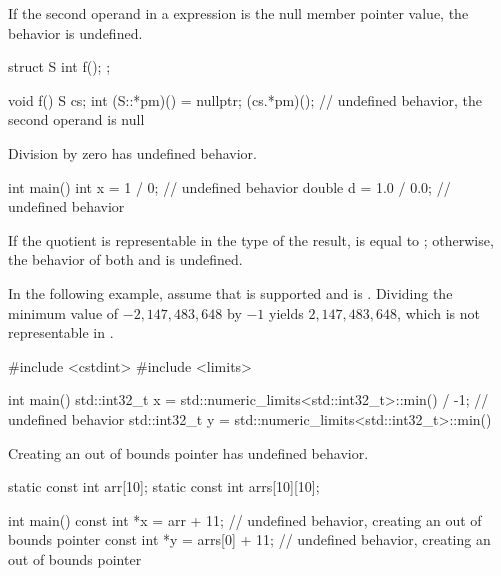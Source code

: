 \pnum
If the second operand in a  expression is the null
member pointer value, the behavior is undefined.

\pnum
\begin{example}
\begin{codeblock}
struct S {
  int f();
};

void f() {
  S cs;
  int (S::*pm)() = nullptr;
  (cs.*pm)();           // undefined behavior, the second operand is null
}
\end{codeblock}
\end{example}


\pnum
Division by zero has undefined behavior.

\pnum
\begin{example}
\begin{codeblock}
int main() {
  int x = 1 / 0;        // undefined behavior
  double d = 1.0 / 0.0; // undefined behavior
}
\end{codeblock}
\end{example}


\pnum
If the
quotient 
is representable in the type of the result,
is equal to ;
otherwise, the behavior of both  and  is undefined.

\pnum
\begin{example}
In the following example, assume that
 is supported
and is .
Dividing the minimum  value
of $-2{,}147{,}483{,}648$
by $-1$ yields
$2{,}147{,}483{,}648$,
which is not representable in .
\begin{codeblock}
#include <cstdint>
#include <limits>

int main() {
  std::int32_t x = std::numeric_limits<std::int32_t>::min() / -1;   // undefined behavior
  std::int32_t y = std::numeric_limits<std::int32_t>::min() %
}
\end{codeblock}
\end{example}


\pnum
Creating an out of bounds pointer has undefined behavior.

\pnum
\begin{example}
\begin{codeblock}
static const int arr[10]{};
static const int arrs[10][10]{};

int main() {
  const int *x = arr + 11;      // undefined behavior, creating an out of bounds pointer
  const int *y = arrs[0] + 11;  // undefined behavior, creating an out of bounds pointer
}
\end{codeblock}
\end{example}

